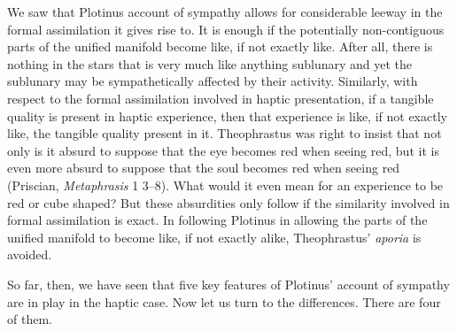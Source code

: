 We saw that Plotinus account of sympathy allows for considerable leeway in the formal assimilation it gives rise to. It is enough if the potentially non-contiguous parts of the unified manifold become like, if not exactly like. After all, there is nothing in the stars that is very much like anything sublunary and yet the sublunary may be sympathetically affected by their activity. Similarly, with respect to the formal assimilation involved in haptic presentation, if a tangible quality is present in haptic experience, then that experience is like, if not exactly like, the tangible quality present in it. Theophrastus was right to insist that not only is it absurd to suppose that the eye becomes red when seeing red, but it is even more absurd to suppose that the soul becomes red when seeing red (Priscian, \emph{Metaphrasis} 1 3--8). What would it even mean for an experience to be red or cube shaped? But these absurdities only follow if the similarity involved in formal assimilation is exact. In following Plotinus in allowing the parts of the unified manifold to become like, if not exactly alike, Theophrastus' \emph{aporia} is avoided. 

So far, then, we have seen that five key features of Plotinus' account of sympathy are in play in the haptic case. Now let us turn to the differences. There are four of them.

